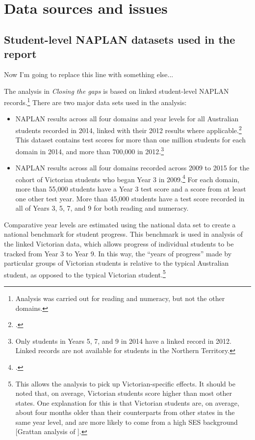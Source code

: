 \chapter{Data sources and issues} \label{chap2}

\section{Student-level NAPLAN datasets used in the report}

Now I'm going to replace this line with something else...

The analysis in \textit{Closing the gaps} is based on linked student-level NAPLAN records.\footnote{Analysis was carried out for reading and numeracy, but not the other domains.} There are two major data sets used in the analysis:
\begin{itemize}
\item NAPLAN results across all four domains and year levels for all Australian students recorded in 2014, linked with their 2012 results where applicable.\footcite{acara2014} This dataset contains test scores for more than one million students for each domain in 2014, and more than 700,000 in 2012.\footnote{Only students in Years 5, 7, and 9 in 2014 have a linked record in 2012. Linked records are not available for students in the Northern Territory.}
\item NAPLAN results across all four domains recorded across 2009 to 2015 for the cohort of Victorian students who began Year 3 in 2009.\footcite{vcaa2015} For each domain, more than 55,000 students have a Year 3 test score and a score from at least one other test year. More than 45,000 students have a test score recorded in all of Years 3, 5, 7, and 9 for both reading and numeracy. 
\end{itemize}

Comparative year levels are estimated using the national data set to create a national benchmark for student progress. This benchmark is used in analysis of the linked Victorian data, which allows progress of individual students to be tracked from Year 3 to Year 9. In this way, the ``years of progress'' made by particular groups of Victorian students is relative to the typical Australian student, as opposed to the typical Victorian student.\footnote{This allows the analysis to pick up Victorian-specific effects. It should be noted that, on average, Victorian students score higher than most other states. One explanation for this is that Victorian students are, on average, about four months older than their counterparts from other states in the same year level, and are more likely to come from a high SES background [Grattan analysis of \textcite{acara2014}].}

